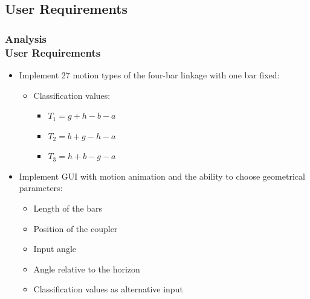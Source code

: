 \documentclass[ucs,10pt]{beamer}
\begin{document}
\subsection{User Requirements}

\begin{frame}
\frametitle{Analysis \\
	\small \color{rwth-blue} User Requirements}
	  \begin{minipage}{\linewidth}
		\centering
		\begin{minipage}{0.6\linewidth}
			\begin{itemize}
				\item Implement 27 motion types of the four-bar linkage with one bar fixed:
				\begin{itemize}
					\item Classification values:
					\begin{itemize}
						\item $T_1 = g + h - b - a$
						\item $T_2 = b + g - h - a$
						\item $T_3 = h + b - g - a$
					\end{itemize}
				\end{itemize}
				\item Implement GUI with motion animation and the ability to choose geometrical parameters:
				\begin{itemize}
					\item Length of the bars
					\item Position of the coupler
					\item Input angle
					\item Angle relative to the horizon
					\item Classification values as alternative input
				\end{itemize}
			\end{itemize}
		\end{minipage}
		\hspace{0.05\linewidth}
		\begin{minipage}{0.31\linewidth}
			\begin{figure}[h]

\end{figure}
\end{minipage}
\end{minipage}
\end{frame}
\end{document}
